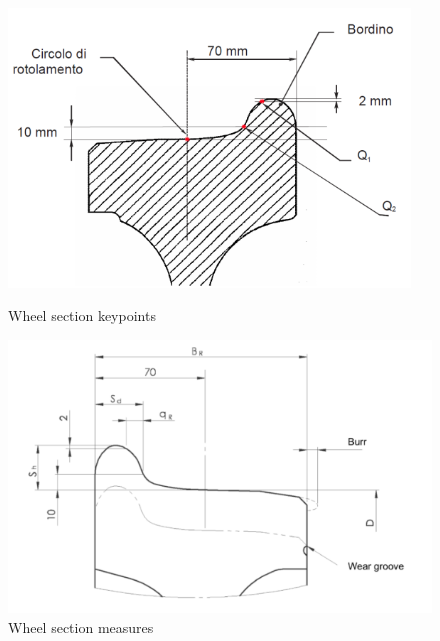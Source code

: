   
  
  \vfill
  
  \begin{figure}[h!]
    \centering
    \begin{minipage}[c]{.50\textwidth}
      \centering
      \includegraphics[width=0.95\textwidth]{./images/wpms/wheel-section.png}
        \caption{Wheel section keypoints}
    \label{fig:keypoints}
    \end{minipage}%
    \begin{minipage}[c]{.50\textwidth}
      \centering
      \includegraphics[width=1.05\textwidth]{./images/wpms/wheel_parameters.png}
      \caption{Wheel section measures}
      \label{fig:measures}
    \end{minipage}
  \end{figure}

  \vfill

